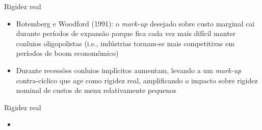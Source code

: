 \documentclass[10pt]{beamer}
\begin{document}
\begin{frame}{Rigidez real}
    \begin{itemize}
        \item Rotemberg e Woodford (1991): o \emph{mark-up} desejado sobre custo marginal cai durante períodos de expansão porque fica cada vez mais difícil manter conluios oligopolistas (i.e., indústrias tornam-se mais competitivas em períodos de boom economômico)\bigskip
        \item Durante recessões conluios implícitos aumentam, levando a um \emph{mark-up} contra-cíclico que age como rigidez real, amplificando o impacto sobre rigidez nominal de custos de menu relativamente pequenos
    \end{itemize}
\end{frame}

\begin{frame}{Rigidez real}
    \begin{itemize}
        \item 
    \end{itemize}
\end{frame}

\end{document}

